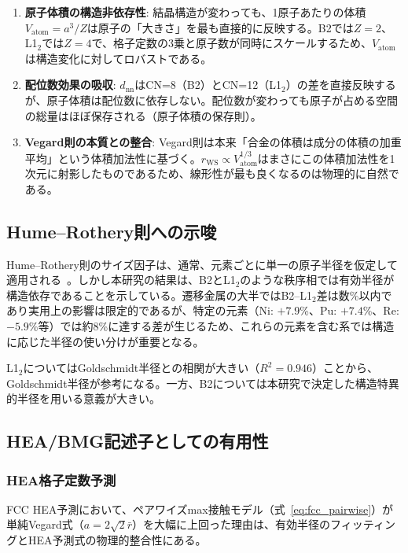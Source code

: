\documentclass[a4paper,10pt,5p]{elsarticle}
\begin{document}
\begin{enumerate}
\setlength{\parskip}{0cm}
\setlength{\itemsep}{0cm}
    \item \textbf{原子体積の構造非依存性}: 結晶構造が変わっても、1原子あたりの体積$V_\mathrm{atom} = a^3/Z$は原子の「大きさ」を最も直接的に反映する。B2では$Z=2$、L1$_2$では$Z=4$で、格子定数の3乗と原子数が同時にスケールするため、$V_\mathrm{atom}$は構造変化に対してロバストである。
    \item \textbf{配位数効果の吸収}: $d_\mathrm{nn}$はCN=8（B2）とCN=12（L1$_2$）の差を直接反映するが、原子体積は配位数に依存しない。配位数が変わっても原子が占める空間の総量はほぼ保存される（原子体積の保存則）。
    \item \textbf{Vegard則の本質との整合}: Vegard則は本来「合金の体積は成分の体積の加重平均」という体積加法性に基づく。$r_\mathrm{WS} \propto V_\mathrm{atom}^{1/3}$はまさにこの体積加法性を1次元に射影したものであるため、線形性が最も良くなるのは物理的に自然である。
\end{enumerate}


\subsection{Hume--Rothery則への示唆}
Hume--Rothery則のサイズ因子は、通常、元素ごとに単一の原子半径を仮定して適用される~\cite{humerothery1936, miracle2017}。しかし本研究の結果は、B2とL1$_2$のような秩序相では有効半径が構造依存であることを示している。遷移金属の大半ではB2--L1$_2$差は数\%以内であり実用上の影響は限定的であるが、特定の元素（Ni: $+7.9$\%、Pu: $+7.4$\%、Re: $-5.9$\%等）では約8\%に達する差が生じるため、これらの元素を含む系では構造に応じた半径の使い分けが重要となる。

L1$_2$についてはGoldschmidt半径との相関が大きい（$R^2 = 0.946$）ことから、Goldschmidt半径が参考になる。一方、B2については本研究で決定した構造特異的半径を用いる意義が大きい。


\subsection{HEA/BMG記述子としての有用性}

\subsubsection{HEA格子定数予測}
FCC HEA予測において、ペアワイズmax接触モデル（式~\ref{eq:fcc_pairwise}）が単純Vegard式（$a = 2\sqrt{2}\bar{r}$）を大幅に上回った理由は、有効半径のフィッティングとHEA予測式の物理的整合性にある。
\end{document}
